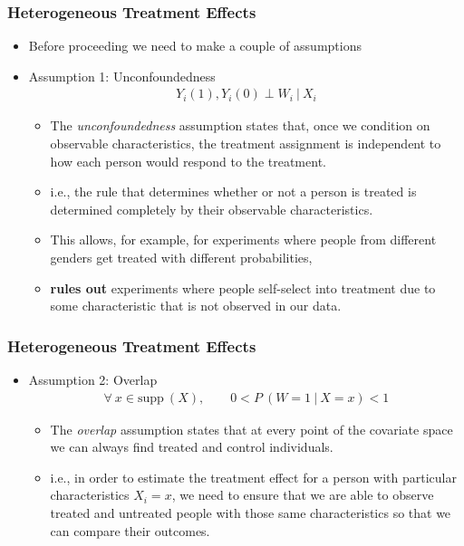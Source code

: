 \documentclass[
  shownotes,
  xcolor={svgnames},
  hyperref={colorlinks,citecolor=DarkBlue,linkcolor=DarkRed,urlcolor=DarkBlue}
  , aspectratio=169]{beamer}
\begin{document}
\begin{frame}[fragile]
\frametitle{Heterogeneous Treatment Effects}

\begin{itemize}
\item Before proceeding we need to make a couple of assumptions




\item Assumption 1: Unconfoundedness
\begin{align}
Y_i(1), Y_i(0) \perp W_i \ | \ X_i
\end{align}
\begin{itemize}
\item The \emph{unconfoundedness} assumption states that, once we condition on observable characteristics, the treatment assignment is independent to
how each person would respond to the treatment. 
\item i.e.,  the rule that determines whether or not a person is treated is determined completely by their observable characteristics. 
\item This allows, for example, for experiments where people from different genders get treated with different probabilities, 
\item {\bf rules out} experiments where people self-select into treatment due to some characteristic that is not observed in our data.

\end{itemize}


\end{itemize}




\end{frame}
\begin{frame}[fragile]
\frametitle{Heterogeneous Treatment Effects}

\begin{itemize}
\item Assumption 2: Overlap
\medskip
\begin{align}
\forall \ x \in \text{supp}\ (X), \qquad 0 < P\ (W = 1 \ | \ X = x)  < 1
\end{align}

  \begin{itemize}
  \item The \emph{overlap} assumption states that at every point of the covariate space we can always find treated and control individuals.
  \medskip
  \item  i.e., in order to estimate the treatment effect for a person with particular  characteristics \(X_{i} = x\), we need to ensure that we are able to
  observe treated and untreated people with those same characteristics so that we can compare their outcomes. 
  \end{itemize}
\end{itemize}




\end{frame}
\end{document}
